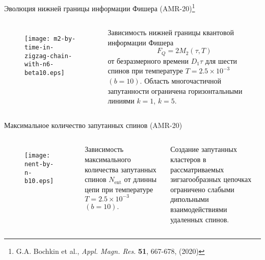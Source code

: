 \begin{frame}{Эволюция нижней границы информации Фишера (AMR-20)\footnote{G.A. Bochkin et al., \textit{Appl. Magn. Res.} \textbf{51}, 667-678, (2020)}}
\begin{columns}

    \begin{figure}
    \texttt{[image: m2-by-time-in-zigzag-chain-with-n6-beta10.eps]}
    \end{figure}

    Зависимость нижней границы квантовой информации Фишера
    $$ F_Q = 2M_2(\tau, T) $$
    от безразмерного времени $D_1 \tau$
    для шести спинов
    при температуре $T = 2.5 \times 10^{-3}$ $(b = 10)$.
    Область многочастичной запутанности ограничена горизонтальными линиями $k = 1$, $k = 5$.
\end{columns}
\end{frame}


\begin{frame}{Максимальное количество запутанных спинов (AMR-20)}
\begin{columns}

    \begin{figure}
    \texttt{[image: nent-by-n-b10.eps]}
    \end{figure}

    Зависимость максимального количества запутанных спинов $N_\mathrm{ent}$ от длинны цепи при температуре $T = 2.5 \times 10^{-3}$ $(b = 10)$.

    \vspace{0.5cm}

    \alert{Создание запутанных кластеров в рассматриваемых зигзагообразных цепочках ограничено слабыми дипольными взаимодействиями удаленных спинов}.
\end{columns}
\end{frame}


